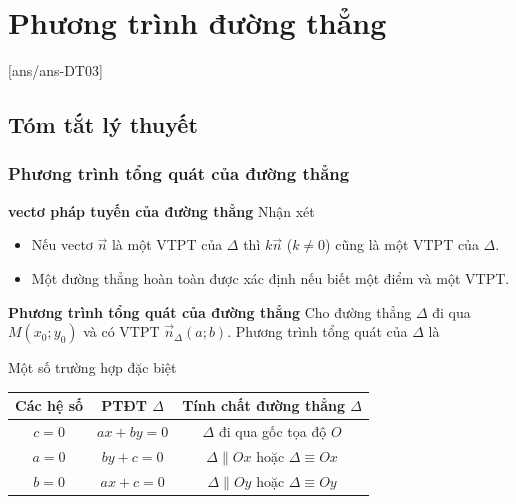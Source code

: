 \setcounter{section}{2}
\setcounter{dang}{0}
\section{Phương trình đường thẳng}
[ans/ans-DT03]
\subsection{Tóm tắt lý thuyết}

\subsubsection{Phương trình tổng quát của đường thẳng}

\textbf{vectơ pháp tuyến của đường thẳng}
	Nhận xét
	\begin{itemize}
		\item Nếu vectơ $\overrightarrow{n}$  là một VTPT của $\Delta$ thì $k \overrightarrow{n}$ ($k \ne 0 $) cũng là một VTPT của $\Delta$. 
		\item Một đường thẳng hoàn toàn được xác định nếu biết một điểm và một VTPT.
	\end{itemize}

\textbf{Phương trình tổng quát của đường thẳng}
	Cho đường thẳng $\Delta$ đi qua $M(x_0;y_0)$ và có VTPT $\overrightarrow{n}_{\Delta} (a;b)$. Phương trình tổng quát của $\Delta$ là 

 Một số trường hợp đặc biệt
	\begin{center}
		\renewcommand{\arraystretch}{2}%
		\begin{tabular}{|c|c|c|}
			\hline 
			Các hệ số & PTĐT $\Delta$ & Tính chất đường thẳng $\Delta$ \\ 
			\hline 
			$c=0$ & $ax+by =0$ & $\Delta$ đi qua gốc tọa độ $O$ \\ 
			\hline 
			$a=0$ & $by+c=0$ & $\Delta \parallel Ox$ hoặc $\Delta  \equiv Ox$ \\ 
			\hline 
			$b=0$ & $ax+c=0$ &  $\Delta \parallel Oy$ hoặc $\Delta  \equiv Oy$ \\ 
			\hline 
		\end{tabular} 
	\end{center}


